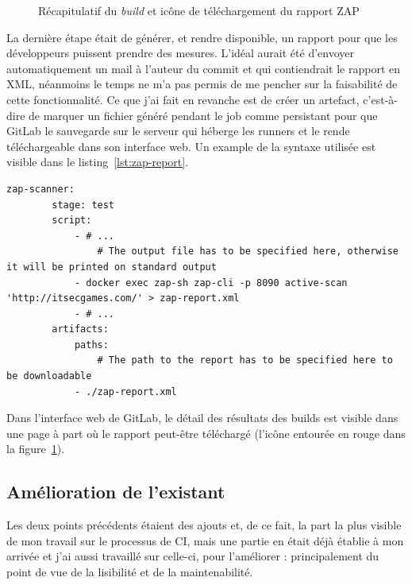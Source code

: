 \begin{figure}[h]
	\centering
	\caption{Récapitulatif du \textit{build} et icône de téléchargement du rapport ZAP}
	\label{fig:gitlab_build_recap}
\end{figure}

La dernière étape était de générer, et rendre disponible, un rapport pour que les développeurs puissent prendre des mesures. L'idéal aurait été d'envoyer automatiquement un mail à l'auteur du commit et qui contiendrait le rapport en XML, néanmoins le temps ne m'a pas permis de me pencher sur la faisabilité de cette fonctionnalité. Ce que j'ai  fait en revanche est de créer un artefact, c'est-à-dire de marquer un fichier généré pendant le job comme persistant pour que GitLab le sauvegarde sur le serveur qui héberge les runners et le rende téléchargeable dans son interface web. Un example de la syntaxe utilisée est visible dans le listing~\ref{lst:zap-report}.

\begin{minipage}{\linewidth}
	\begin{lstlisting}[caption={Extrait de code qui lance un scanner ZAP en ligne de commande et rend le rapport disponible sur GitLab},label={lst:zap-report}]
		zap-scanner:
		stage: test
		script:
			- # ...
				# The output file has to be specified here, otherwise it will be printed on standard output
			- docker exec zap-sh zap-cli -p 8090 active-scan 'http://itsecgames.com/' > zap-report.xml 
			- # ...
		artifacts:
			paths:
				# The path to the report has to be specified here to be downloadable 
			- ./zap-report.xml
	\end{lstlisting}
\end{minipage}

Dans l'interface web de GitLab, le détail des résultats des builds est visible dans une page à part où le rapport peut-être téléchargé (l'icône entourée en rouge dans la figure~\ref{fig:gitlab_build_recap}).

\subsection{Amélioration de l'existant}
Les deux points précédents étaient des ajouts et, de ce fait, la part la plus visible de mon travail sur le processus de CI, mais une partie en était déjà établie à mon arrivée et j'ai aussi travaillé sur celle-ci, pour l'améliorer : principalement du point de vue de la lisibilité et de la maintenabilité.

